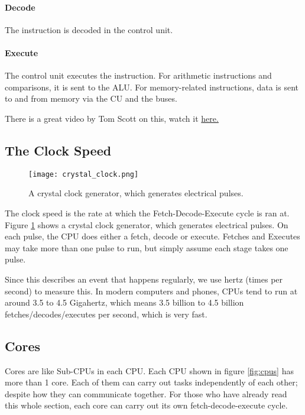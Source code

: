 \documentclass[../main.tex]{subfiles}
\begin{document}
\paragraph{Decode}

The instruction is decoded in the control unit.

\paragraph{Execute}

The control unit executes the instruction. For arithmetic instructions and comparisons, it is sent to the ALU. For memory-related instructions, data is sent to and from memory via the CU and the buses.

There is a great video by Tom Scott on this, watch it \href{https://www.youtube.com/watch?v=Z5JC9Ve1sfI}{here.}

\subsection{The Clock Speed}

\begin{figure}[H]
    \centering
    \texttt{[image: crystal\_clock.png]}
    \caption{A crystal clock generator, which generates electrical pulses.}
    \label{fig:crystal_clock}
\end{figure}

The clock speed is the rate at which the Fetch-Decode-Execute cycle is ran at. Figure \ref{fig:crystal_clock} shows a crystal clock generator, which generates electrical pulses. On each pulse, the CPU does either a fetch, decode or execute. Fetches and Executes may take more than one pulse to run, but simply assume each stage takes one pulse.

Since this describes an event that happens regularly, we use hertz (times per second) to measure this. In modern computers and phones, CPUs tend to run at around 3.5 to 4.5 Gigahertz, which means 3.5 billion to 4.5 billion fetches/decodes/executes per second, which is very fast.

\subsection{Cores}

Cores are like Sub-CPUs in each CPU. Each CPU shown in figure \ref{fig:cpus} has more than 1 core. Each of them can carry out tasks independently of each other; despite how they can communicate together. For those who have already read this whole section, each core can carry out its own fetch-decode-execute cycle.
\end{document}
